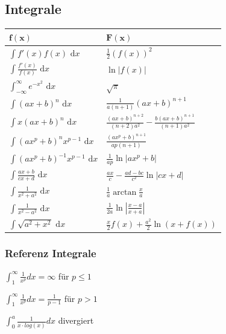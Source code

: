 \documentclass[a4paper]{article}
\def\dx{\text{ d}x}
\begin{document}
\subsection{Integrale}
\begin{center}
  \begin{tabularx}{\linewidth}{>{\centering\arraybackslash}X>{\centering\arraybackslash}X}
    \toprule
    $\mathbf{f(x)}$                      & $\mathbf{F(x)}$                                                  \\
    \midrule
    $\int f'(x) f(x) \dx$                & $\frac{1}{2}(f(x))^2$                                            \\
    $\int \frac{f'(x)}{f(x)} \dx$        & $\ln|f(x)|$                                                      \\
    $\int_{-\infty}^\infty e^{-x^2} \dx$ & $\sqrt{\pi}$                                                     \\
    $\int (ax+b)^n \dx$                  & $\frac{1}{a(n+1)}(ax+b)^{n+1}$                                   \\
    $\int x(ax+b)^n \dx$                 & $\frac{(ax+b)^{n+2}}{(n+2)a^2} - \frac{b(ax+b)^{n+1}}{(n+1)a^2}$ \\
    $\int (ax^p+b)^n x^{p-1} \dx$        & $\frac{(ax^p+b)^{n+1}}{ap(n+1)}$                                 \\
    $\int (ax^p + b)^{-1} x^{p-1} \dx$   & $\frac{1}{ap} \ln |ax^p + b|$                                    \\
    $\int \frac{ax+b}{cx+d} \dx$         & $\frac{ax}{c} - \frac{ad-bc}{c^2} \ln |cx +d|$                   \\
    $\int \frac{1}{x^2+a^2} \dx$         & $\frac{1}{a} \arctan \frac{x}{a}$                                \\
    $\int \frac{1}{x^2 - a^2} \dx$       & $\frac{1}{2a} \ln\left| \frac{x-a}{x+a} \right|$                 \\
    $\int \sqrt{a^2+x^2} \dx $           & $\frac{x}{2}f(x) + \frac{a^2}{2}\ln(x+f(x))$                     \\
    \bottomrule
  \end{tabularx}
\end{center}

\subsubsection*{Referenz Integrale}
\begin{inparaitem}
  \item $\int_1^{\infty} \frac{1}{x^p} dx = \infty$ für $p \leq 1$
  \item $\int_1^{\infty} \frac{1}{x^p} dx = \frac{1}{p-1}$ für $p > 1$
  \item $\int_0^{a} \frac{1}{x \cdot log(x)} dx$ divergiert
\end{inparaitem}
\end{document}
